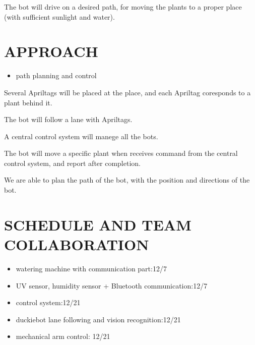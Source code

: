 \documentclass[a4paper, 10pt, conference]{ieeeconf}      %
\begin{document}
The bot will drive on a desired path, for moving the plants to a proper place (with sufficient sunlight and water).\\

\section{APPROACH}

\begin{itemize}
\item path planning and control
\end{itemize}


Several Apriltags will be placed at the place, and each Apriltag coresponds to a plant behind it.

The bot will follow a lane with Apriltags.

A central control system will manege all the bots.

The bot will move a specific plant when receives command from the central control system, and report after completion.

We are able to plan the path of the bot, with the position and directions of the bot.

\section{SCHEDULE AND TEAM COLLABORATION}

\begin{itemize}
\item watering machine with communication part:12/7
\item UV sensor, humidity sensor + Bluetooth communication:12/7
\item control system:12/21
\item duckiebot lane following and vision recognition:12/21
\item mechanical arm control: 12/21
\end{itemize}
   

\addtolength{\textheight}{-12cm}   %



\end{document}
